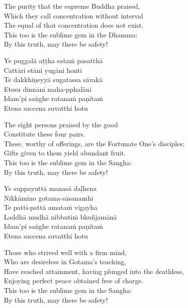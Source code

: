 \begin{english-verses}
  The purity that the supreme Buddha praised,\\
  Which they call concentration without interval\\
  The equal of that concentration does not exist.\\
  This too is the sublime gem in the Dhamma:\\
  By this truth, may there be safety!
\end{english-verses}

\begin{pali-hang-continued}
  Ye puggalā aṭṭha sataṁ pasatthā\\
  Cattāri etāni yugāni honti\\
  Te dakkhiṇeyyā sugatassa sāvakā\\
  Etesu dinnāni maha-pphalāni\\
  Idam'pi saṅghe ratanaṁ paṇītaṁ\\
  Etena saccena suvatthi hotu
\end{pali-hang-continued}

\begin{english-verses}
  The eight persons praised by the good\\
  Constitute these four pairs.\\
  These, worthy of offerings, are the Fortunate One's disciples;\\
  Gifts given to them yield abundant fruit.\\
  This too is the sublime gem in the Sangha:\\
  By this truth, may there be safety!
\end{english-verses}

\begin{pali-hang-continued}
  Ye suppayuttā manasā daḷhena\\
  Nikkāmino gotama-sāsanamhi\\
  Te patti-pattā amataṁ vigayha\\
  Laddhā mudhā nibbutiṁ bhuñjamānā\\
  Idam'pi saṅghe ratanaṁ paṇītaṁ\\
  Etena saccena suvatthi hotu
\end{pali-hang-continued}

\begin{english-verses}
  Those who strived well with a firm mind,\\
  Who are desireless in Gotama's teaching,\\
  Have reached attainment, having plunged into the deathless,\\
  Enjoying perfect peace obtained free of charge.\\
  This too is the sublime gem in the Sangha:\\
  By this truth, may there be safety!
\end{english-verses}

